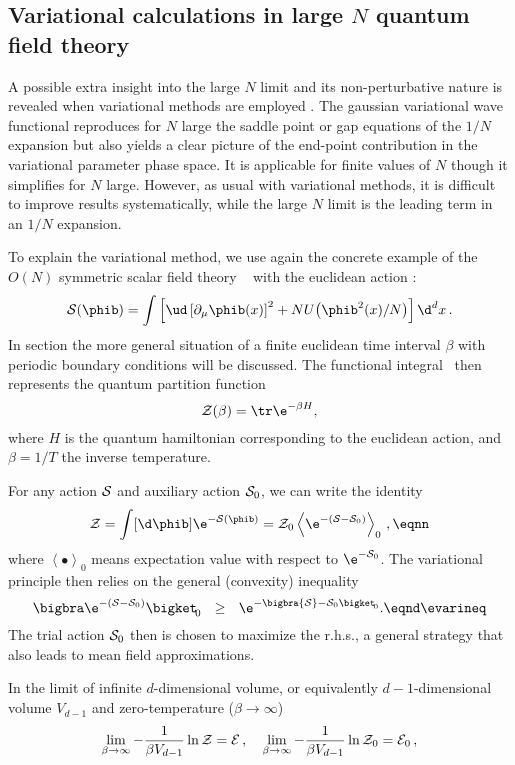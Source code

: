 \subsection{Variational calculations in large $N$ quantum field theory}

A possible extra insight into the large $N$ limit and its non-perturbative nature
is revealed when  variational methods are employed \rBarMos.
The gaussian variational wave functional reproduces for $N$ large
the saddle point or gap equations of the $1/N$ expansion but also yields a clear
picture of the end-point contribution in the variational
parameter phase space.  It is  applicable for finite values of $N$ though it simplifies for $N$ large. However, as usual with variational methods, it is difficult to improve results systematically, while the large $N$ limit is the leading term in an  $1/N$ expansion.\sslbl\ssNVarfiv
\par
To explain the variational method, we  use again the concrete
example of the $O(N)$ symmetric scalar field theory \eONpart\
with the euclidean action   \eactONgen:
$$ {\cal S}  ( \phib )= \int \left[\ud \left[
\partial_{\mu} \phib (x) \right]^2+NU\bigl(\phib^2(x)/N\bigr)  \right] \d^{d}x\,.
 $$
In section \label{\scFTQFT} the more general situation
of a  finite euclidean time interval $\beta$  with periodic
boundary conditions will be discussed. The functional integral \eONpart\
then represents the quantum partition function
$${\cal Z}(\beta)=\tr\e^{-\beta H},$$
where $H$ is the quantum hamiltonian corresponding to the euclidean
action, and $\beta =1/T$ the inverse temperature. \par
For any   action  ${\cal S}$ and auxiliary action ${\cal S}_0$,
we can write the identity
$$ {\cal Z} = \int [\d \phib] \e^{-{\cal S}(\phib)}
= {\cal Z}_0 \left< \e^{-({\cal S}-{\cal S}_0)} \right>_0\,,\eqnn $$
where $\left<\bullet\right>_0$ means expectation value with respect
to $\e^{-{\cal S}_0}$.
The variational principle then relies on the general (convexity) inequality
$$\bigbra \e^{-({\cal S}-{\cal S}_0)} \bigket_{\!0}~~\geq
~~\e^{-\bigbra {\cal S}-{\cal S}_0 \bigket_{\!0}}. \eqnd\evarineq $$
The trial action ${\cal S}_0$  then is chosen to maximize the r.h.s., a general strategy that also leads to mean field approximations.\par
In the limit of infinite $d$-dimensional volume, or equivalently
$d-1$-dimensional volume $V_{d-1}$ and zero-temperature ($\beta\to\infty $)
$$\lim_{\beta\to\infty }-{1\over\beta V_{d-1}}\ln{\cal Z}= {\cal E} \,,\quad
\lim_{\beta\to\infty }-{1\over\beta V_{d-1}}\ln{\cal Z}_0= {\cal E}_0 \,,$$
